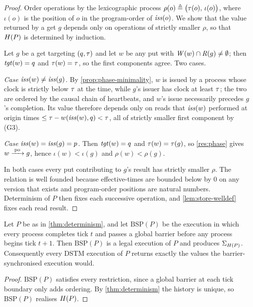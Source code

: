 \begin{proof}
Order operations by the lexicographic process
$\rho(o) \triangleq \bigl(\tau(o),\, \iota(o)\bigr)$, where $\iota(o)$ is the
position of $o$ in the \gls{program-order} of $\mathit{iss}(o)$. We show that the value
returned by a get $g$ depends only on operations of strictly smaller $\rho$,
so that $H(P)$ is determined by induction.

Let $g$ be a get targeting $(q,\tau)$ and let $w$ be any put with
$\mathit{W}(w) \cap \mathit{R}(g) \ne \emptyset$; then $\mathit{tgt}(w) = q$ and
$\tau(w) = \tau$, so the first components agree. Two cases.

\emph{Case $\mathit{iss}(w) \ne \mathit{iss}(g)$.} By \cref{prop:phase-minimality}, $w$ is
issued by a process whose clock is strictly below $\tau$ at the time, while $g$'s
issuer has clock at least $\tau$; the two are ordered by the causal chain of
\glspl{heartbeat}, and $w$'s issue necessarily precedes $g$'s completion. Its value
therefore depends only on reads that $\mathit{iss}(w)$ performed at origin times
$\le \tau - w(\mathit{iss}(w),q) < \tau$, all of strictly smaller first
component by (G3).

\emph{Case $\mathit{iss}(w) = \mathit{iss}(g) = p$.} Then $\mathit{tgt}(w) = q$ and
$\tau(w) = \tau(g)$, so \cref{res:phase} gives $w \xrightarrow{\;\mathrm{po}\;} g$, hence
$\iota(w) < \iota(g)$ and $\rho(w) < \rho(g)$.

In both cases every put contributing to $g$'s result has strictly smaller
$\rho$. The relation is well founded because \glspl{effective-time} are bounded below
by $0$ on any version that exists and program-order positions are natural
numbers. Determinism of $P$ then fixes each successive operation, and
\cref{lem:store-welldef} fixes each read result.
\end{proof}

\begin{corollary}\label{thm:bsp}
Let $P$ be as in \cref{thm:determinism}, and let $\mathrm{BSP}(P)$ be the
execution in which every process completes tick $t$ and passes a global barrier
before any process begins tick $t+1$. Then $\mathrm{BSP}(P)$ is a legal execution
of $P$ and produces $\Sigma_{H(P)}$. Consequently every DSTM execution of
$P$ returns exactly the values the barrier-synchronised execution would.
\end{corollary}

\begin{proof}
$\mathrm{BSP}(P)$ satisfies every restriction, since a global barrier at each
tick boundary only adds ordering. By \cref{thm:determinism} the history is
unique, so $\mathrm{BSP}(P)$ realises $H(P)$.
\end{proof}

